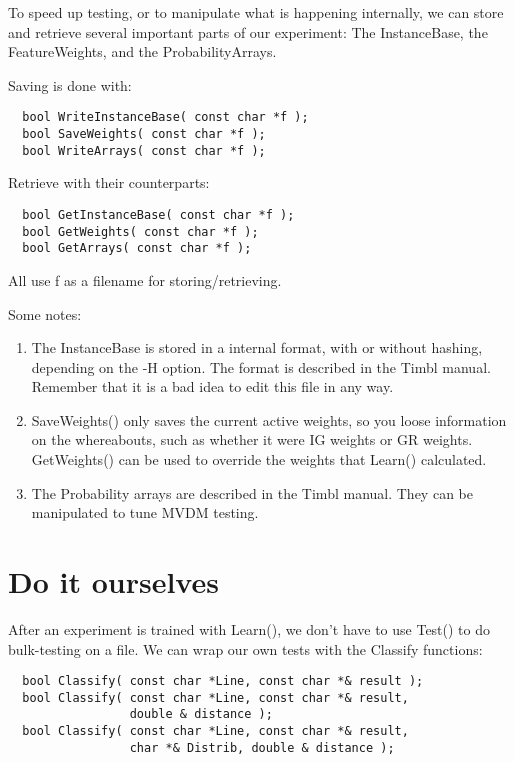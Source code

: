 \documentclass{article}
\begin{document}
To speed up testing, or to manipulate what is happening
internally, %
we can store and retrieve several important parts of our experiment:
The InstanceBase, the FeatureWeights, and the ProbabilityArrays.

Saving is done with:

\begin{verbatim}
  bool WriteInstanceBase( const char *f );
  bool SaveWeights( const char *f );
  bool WriteArrays( const char *f );
\end{verbatim}

Retrieve with their counterparts:

\begin{verbatim}
  bool GetInstanceBase( const char *f );
  bool GetWeights( const char *f );
  bool GetArrays( const char *f );
\end{verbatim}

All use f as a filename for storing/retrieving.

Some notes:\\
\begin{enumerate}
\item The InstanceBase is stored in a internal format, with or without
hashing, depending on the -H option. The format is described in the
Timbl manual. Remember that it is a bad idea to edit this file in any way.
\item  SaveWeights() only saves the current active weights, so you loose
information on the whereabouts, such as whether it were IG weights or
GR weights. GetWeights() can be used to override the weights that
Learn() calculated. 
\item The Probability arrays are described in the Timbl manual. They can be
manipulated to tune MVDM testing.
\end{enumerate}

\section{Do it ourselves}

After an experiment is trained with Learn(), we don't have to use
Test() to do bulk-testing on a file.
We can wrap our own tests with the Classify functions:

\begin{verbatim}
  bool Classify( const char *Line, const char *& result );
  bool Classify( const char *Line, const char *& result, 
                 double & distance );
  bool Classify( const char *Line, const char *& result,
                 char *& Distrib, double & distance );
\end{verbatim}
\end{document}
